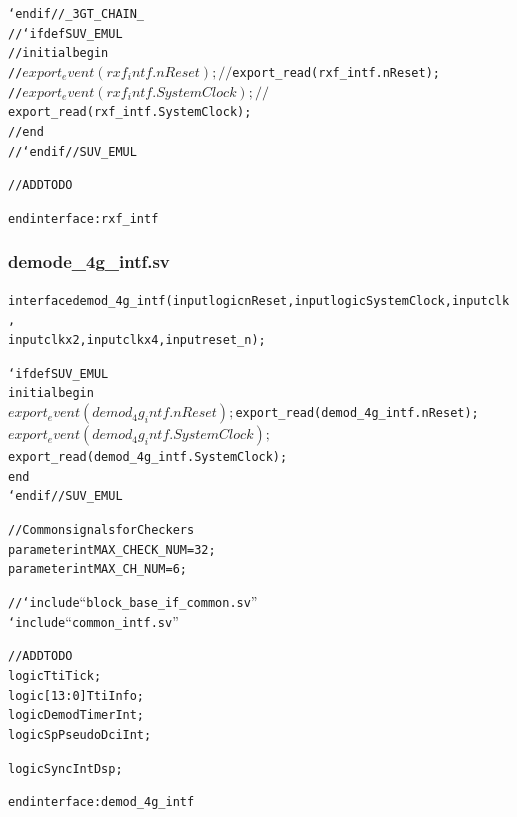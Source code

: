 \documentclass{note}
\begin{document}
\begin{alltt}
   `endif // _3GT_CHAIN_
//`ifdef SUV_EMUL
//initial begin
//   $export_event(rxf_intf.nReset);
//   $export_read(rxf_intf.nReset);
//   $export_event(rxf_intf.SystemClock);
//   $export_read(rxf_intf.SystemClock);
//end
//`endif // SUV_EMUL


// ADD TO DO

endinterface : rxf_intf


\end{alltt}

\subsubsection{demode\_4g\_intf.sv}
\begin{alltt}

interface demod_4g_intf(input logic nReset, input logic SystemClock, input clk,
input clkx2, input clkx4, input reset_n);

`ifdef SUV_EMUL
initial begin
   $export_event(demod_4g_intf.nReset);
   $export_read(demod_4g_intf.nReset);
   $export_event(demod_4g_intf.SystemClock);
   $export_read(demod_4g_intf.SystemClock);
end
`endif // SUV_EMUL

// Common signals for Checkers
parameter int MAX_CHECK_NUM = 32;
parameter int MAX_CH_NUM = 6;

//`include ``block_base_if_common.sv''
`include ``common_intf.sv''


// ADD TO DO
logic         TtiTick;
logic [13:0]  TtiInfo;
logic         DemodTimerInt;
logic         SpPseudoDciInt;

logic         SyncIntDsp;

endinterface : demod_4g_intf
\end{alltt}
\end{document}
